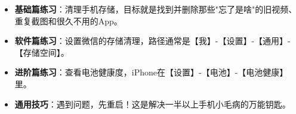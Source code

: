 
\begin{itemize}
  \item \textbf{基础篇练习}：清理手机存储，目标就是找到并删除那些"忘了是啥"的旧视频、重复截图和很久不用的App。
  \item \textbf{软件篇练习}：设置微信的存储清理，路径通常是【我】-【设置】-【通用】-【存储空间】。
  \item \textbf{进阶篇练习}：查看电池健康度，iPhone在【设置】-【电池】-【电池健康】里。
  \item \textbf{通用技巧}：遇到问题，先重启！这是解决一半以上手机小毛病的万能钥匙。
\end{itemize}

